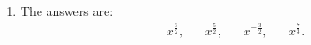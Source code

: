 \begin{enumerate}
\item The answers are:
\begin{align*}
x^{\frac{3}{2}},&& x^{\frac{5}{2}},&& x^{-\frac{3}{2}},&& x^{\frac{7}{3}}.
\end{align*}



















\end{enumerate}

